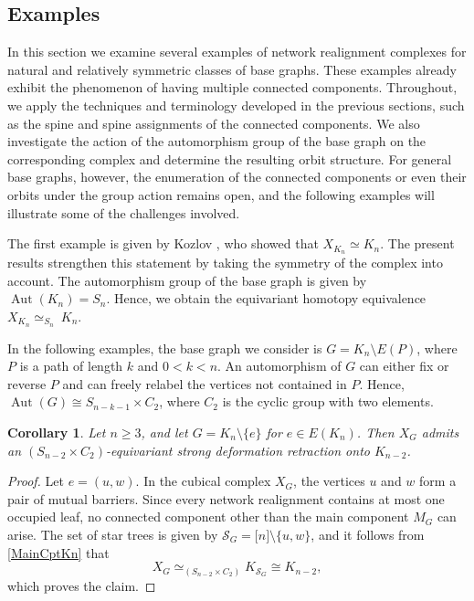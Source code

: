 \documentclass[reqno,dvipsnames]{amsart}
\theoremstyle{plain}
\newtheorem{corollary}[theorem]{Corollary}
\numberwithin{equation}{section}
\theoremstyle{definition}
\DeclareMathOperator{\Aut}{Aut}
\begin{document}
	\subsection{Examples}\label{sec:examples}
In this section we examine several examples of network realignment complexes for natural and relatively symmetric classes of base graphs. These examples already exhibit the phenomenon of having multiple connected components. Throughout, we apply the techniques and terminology developed in the previous sections, such as the spine and spine assignments of the connected components. We also investigate the action of the automorphism group of the base graph on the corresponding complex and determine the resulting orbit structure. For general base graphs, however, the enumeration of the connected components or even their orbits under the group action remains open, and the following examples will illustrate some of the challenges involved. 

The first example is given by Kozlov \cite{Kozlov25}, who showed that $X_{K_n} \simeq K_n$. The present results strengthen this statement by taking the symmetry of the complex into account. The automorphism group of the base graph is given by $\Aut(K_n)=S_n$. Hence, we obtain the equivariant homotopy equivalence $X_{K_n} \simeq_{S_n}~K_n$. 

In the following examples, the base graph we consider is $G = K_n\setminus E(P)$, where $P$ is a path of length $k$ and $0<k<n$. An automorphism of $G$ can either fix or reverse $P$ and can freely relabel the vertices not contained in $P$. Hence, $\Aut(G) \cong S_{n-k-1}\times C_2$, where $C_2$ is the cyclic group with two elements.

\begin{corollary}\label{1EdgeM}
	Let $n\geq 3$, and let $G=K_n\setminus \{e\}$ for $e\in E(K_n)$. Then $X_G$ admits an $(S_{n-2}\times C_2)$-equivariant strong deformation retraction onto $K_{n-2}$.
\end{corollary}

\begin{proof} 
	Let $e=(u,w)$. In the cubical complex $X_G$, the vertices $u$ and $w$ form a pair of mutual barriers. Since every network realignment contains at most one occupied leaf, no connected component other than the main component $M_G$ can arise. The set of star trees is given by $\mathcal{S}_G = \lbrack n \rbrack \setminus\{u,w\}$, and it follows from \autoref{MainCptKn} that
	\begin{equation*}
		X_G \simeq_{(S_{n-2}\times C_2)} K_{\mathcal S_G} \cong K_{n-2},
	\end{equation*}
	which proves the claim.
\end{proof}
\end{document}
